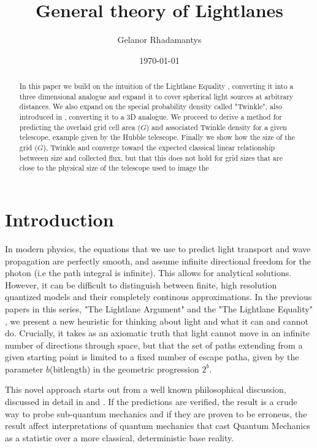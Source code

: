 \documentclass[notitlepage]{article}
\title{General theory of Lightlanes}
\author{Gelanor Rhadamantys}
\date{\today}
\begin{document}
\maketitle
\thispagestyle{empty}

\begin{abstract}

In this paper we build on the intuition of the Lightlane Equality \citep{RhadamantysA2}, converting it into a three dimensional analogue and expand it to cover spherical light sources at arbitrary distances. We also expand on the special probability density called "Twinkle", also introduced in \citep{RhadamantysA2}, converting it to a 3D analogue. 
We proceed to derive a method for predicting the overlaid grid cell area ($G$) and associated Twinkle density for a given telescope, example given by the Hubble telescope.
Finally we show how the size of the grid ($G$), Twinkle and converge toward the expected classical linear relationship betweeen size and collected flux, but that this does not hold for grid sizes that are close to the physical size of the telescope used to image the 

\end{abstract}

\section{Introduction}
In modern physics, the equations that we use to predict light transport and wave propagation are perfectly smooth, and assume infinite directional freedom for the photon (i.e the path integral is infinite). This allows for analytical solutions. However, it can be difficult to distinguish between finite, high resolution quantized models and their completely continous approximations. In the previous papers in this series, "The Lightlane Argument"  \cite{RhadamantysA1}  and the "The Lightlane Equality" \cite{RhadamantysA2} , we present a new heuristic for thinking about light and what it can and cannot do. Crucially, it takes as an axiomatic truth that light cannot move in an infinite number of directions through space, but that the set of paths extending from a given starting point is limited to a fixed number of escape patha, given by the parameter $b$(bitlength) in  the geometric progression $2^b$.

This novel approach starts out from a well known philosophical discussion, discussed in detail in \cite{RhadamantysA1} and \cite{RhadamantysA2}. If the predictions are verified, the result is a crude way to probe sub-quantum mechanics and if they are proven to be erroneus, the result affect interpretations of quantum mechanics that cast Quantum Mechanics as a statistic over a more classical, deterministic base reality. 
\end{document}
